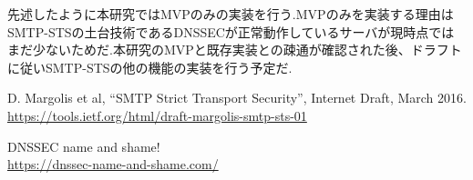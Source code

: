 \documentclass[a4j,10pt]{jsarticle}
\begin{document}
先述したように本研究ではMVPのみの実装を行う.MVPのみを実装する理由はSMTP-STSの土台技術であるDNSSECが正常動作しているサーバが現時点ではまだ少ないためだ.\cite{dnssec}本研究のMVPと既存実装との疎通が確認された後、ドラフトに従いSMTP-STSの他の機能の実装を行う予定だ.

\begin{thebibliography}{9}
D. Margolis et al, “SMTP Strict Transport Security”, Internet Draft, March 2016.\\
\url{https://tools.ietf.org/html/draft-margolis-smtp-sts-01}

DNSSEC name and shame!\\
\url{ https://dnssec-name-and-shame.com/}
\end{thebibliography}
\end{document}
